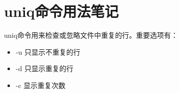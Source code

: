 \section{uniq命令用法笔记}

uniq命令用来检查或忽略文件中重复的行。重要选项有：

\begin{itemize}
    \item -u 只显示不重复的行
    \item -d 只显示重复的行
    \item -c 显示重复次数
\end{itemize}


